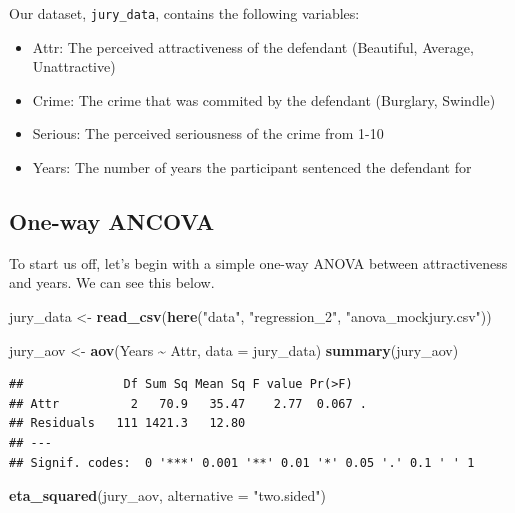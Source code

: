 \documentclass[
]{book}
\newenvironment{Shaded}{\begin{snugshade}}{\end{snugshade}}
\newcommand{\AttributeTok}[1]{\textcolor[rgb]{0.13,0.29,0.53}{#1}}
\newcommand{\FunctionTok}[1]{\textcolor[rgb]{0.13,0.29,0.53}{\textbf{#1}}}
\newcommand{\NormalTok}[1]{#1}
\newcommand{\OtherTok}[1]{\textcolor[rgb]{0.56,0.35,0.01}{#1}}
\newcommand{\SpecialCharTok}[1]{\textcolor[rgb]{0.81,0.36,0.00}{\textbf{#1}}}
\newcommand{\StringTok}[1]{\textcolor[rgb]{0.31,0.60,0.02}{#1}}
\providecommand{\tightlist}{%
  \setlength{\itemsep}{0pt}\setlength{\parskip}{0pt}}
\begin{document}
Our dataset, \texttt{jury\_data}, contains the following variables:

\begin{itemize}
\tightlist
\item
  Attr: The perceived attractiveness of the defendant (Beautiful, Average, Unattractive)
\item
  Crime: The crime that was commited by the defendant (Burglary, Swindle)
\item
  Serious: The perceived seriousness of the crime from 1-10
\item
  Years: The number of years the participant sentenced the defendant for
\end{itemize}

\subsection{One-way ANCOVA}\label{one-way-ancova}

To start us off, let's begin with a simple one-way ANOVA between attractiveness and years. We can see this below.

\begin{Shaded}
\begin{Highlighting}[]
\NormalTok{jury\_data }\OtherTok{\textless{}{-}} \FunctionTok{read\_csv}\NormalTok{(}\FunctionTok{here}\NormalTok{(}\StringTok{"data"}\NormalTok{, }\StringTok{"regression\_2"}\NormalTok{, }\StringTok{"anova\_mockjury.csv"}\NormalTok{))}
\end{Highlighting}
\end{Shaded}

\begin{Shaded}
\begin{Highlighting}[]
\NormalTok{jury\_aov }\OtherTok{\textless{}{-}} \FunctionTok{aov}\NormalTok{(Years }\SpecialCharTok{\textasciitilde{}}\NormalTok{ Attr, }\AttributeTok{data =}\NormalTok{ jury\_data)}
\FunctionTok{summary}\NormalTok{(jury\_aov)}
\end{Highlighting}
\end{Shaded}

\begin{verbatim}
##              Df Sum Sq Mean Sq F value Pr(>F)  
## Attr          2   70.9   35.47    2.77  0.067 .
## Residuals   111 1421.3   12.80                 
## ---
## Signif. codes:  0 '***' 0.001 '**' 0.01 '*' 0.05 '.' 0.1 ' ' 1
\end{verbatim}

\begin{Shaded}
\begin{Highlighting}[]
\FunctionTok{eta\_squared}\NormalTok{(jury\_aov, }\AttributeTok{alternative =} \StringTok{"two.sided"}\NormalTok{)}
\end{Highlighting}
\end{Shaded}
\end{document}

